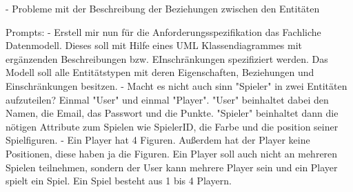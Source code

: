     - Probleme mit der Beschreibung der Beziehungen zwischen den Entitäten

    Prompts:
        - Erstell mir nun für die Anforderungsspezifikation das Fachliche Datenmodell. Dieses soll mit Hilfe eines UML Klassendiagrammes mit ergänzenden Beschreibungen bzw. EInschränkungen spezifiziert werden. Das Modell soll alle Entitätstypen mit deren Eigenschaften, Beziehungen und Einschränkungen besitzen.
        - Macht es nicht auch sinn "Spieler" in zwei Entitäten aufzuteilen? Einmal "User" und einmal "Player".  "User" beinhaltet dabei den Namen, die Email, das Passwort und die Punkte. "Spieler" beinhaltet dann die nötigen Attribute zum Spielen wie SpielerID, die Farbe und die position seiner Spielfiguren.
        - Ein Player hat 4 Figuren. Außerdem hat der Player keine Positionen, diese haben ja die Figuren. Ein Player soll auch nicht an mehreren Spielen teilnehmen, sondern der User kann mehrere Player sein und ein Player spielt ein Spiel. Ein Spiel besteht aus 1 bis 4 Playern.
